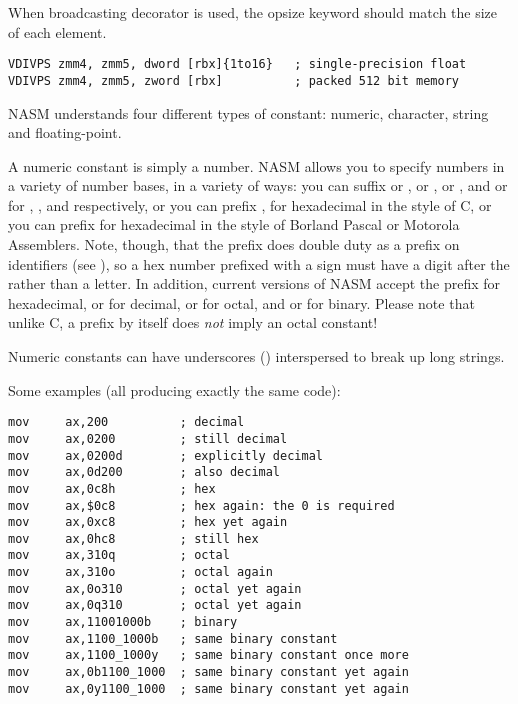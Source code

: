 When broadcasting decorator is used, the opsize keyword should match
the size of each element.

\begin{lstlisting}
VDIVPS zmm4, zmm5, dword [rbx]{1to16}   ; single-precision float
VDIVPS zmm4, zmm5, zword [rbx]          ; packed 512 bit memory
\end{lstlisting}


NASM understands four different types of constant: numeric,
character, string and floating-point.


A numeric constant is simply a number. NASM allows you to specify
numbers in a variety of number bases, in a variety of ways: you can
suffix  or ,  or ,  or
, and  or  for ,
,  and  respectively,
or you can prefix , for hexadecimal in the style of C, or you
can prefix \code{\$} for hexadecimal in the style of Borland Pascal or
Motorola Assemblers. Note, though, that the \index{\$} \code{\$}
prefix does double duty as a prefix on identifiers (see ),
so a hex number prefixed with a \code{\$} sign must have a digit after the
\code{\$} rather than a letter. In addition, current versions of NASM accept
the prefix  for hexadecimal,  or  for decimal,
 or  for octal, and  or  for binary.
Please note that unlike C, a  prefix by itself does \emph{not} imply
an octal constant!

Numeric constants can have underscores (\code{\_}) interspersed to break
up long strings.

Some examples (all producing exactly the same code):

\begin{lstlisting}
mov     ax,200          ; decimal
mov     ax,0200         ; still decimal
mov     ax,0200d        ; explicitly decimal
mov     ax,0d200        ; also decimal
mov     ax,0c8h         ; hex
mov     ax,$0c8         ; hex again: the 0 is required
mov     ax,0xc8         ; hex yet again
mov     ax,0hc8         ; still hex
mov     ax,310q         ; octal
mov     ax,310o         ; octal again
mov     ax,0o310        ; octal yet again
mov     ax,0q310        ; octal yet again
mov     ax,11001000b    ; binary
mov     ax,1100_1000b   ; same binary constant
mov     ax,1100_1000y   ; same binary constant once more
mov     ax,0b1100_1000  ; same binary constant yet again
mov     ax,0y1100_1000  ; same binary constant yet again
\end{lstlisting}


